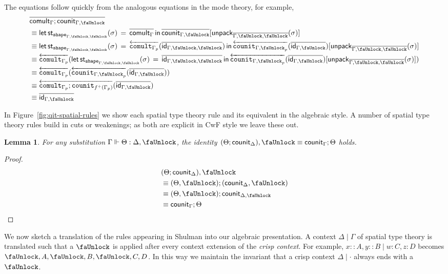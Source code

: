 \documentclass[10pt]{article}
\newtheorem{lemma}{Lemma}
\theoremstyle{definition}
\newcommand{\id}{\mathsf{id}}
\newcommand{\rewrite}[2]{\overleftarrow{#1}(#2)}
\newcommand\StI[2]{\ensuremath{\mathsf{st}_{#1}(#2)}}
\newcommand\StE[4]{\ensuremath{\mathsf{let} \, \StI{#1}{#3} \, = \, {#2} \, \mathsf{in} \, #4}}
\newcommand\TrPlus[2]{\ensuremath{{#1}^+(#2)}}
\newcommand\unpack[2]{\ensuremath{\mathsf{unpack}_{#1}(#2)}}
\newcommand{\modeof}[1]{{#1}_p}
\newcommand{\tshape}[1]{\ensuremath{\mathtt{shape}_{#1}}}
\newcommand{\qyields}{\Vdash}
\newcommand{\upstairs}[1]{\overline{#1}}
\newcommand{\lock}{\text{\faUnlock}}
\newcommand\fcomult[1]{\ensuremath{\mathtt{comult}_{#1}}}
\newcommand\fcounit[1]{\ensuremath{\mathtt{counit}_{#1}}}
\newcommand{\counit}[1]{\mathsf{counit}_{#1}}
\newcommand{\comult}[1]{\mathsf{comult}_{#1}}
\begin{document}
The equations follow quickly from the analogous equations in the mode theory, for example, 
\begin{align*}
&\upstairs{\comult{\Gamma} ; \counit{\Gamma, \lock}} \\
&\equiv \StE{\tshape{\Gamma, \lock, \lock}}{\upstairs{\comult{\Gamma}}}{\sigma}{\upstairs{\counit{\Gamma, \lock}}[\unpack{\upstairs{\Gamma, \lock, \lock}}{\sigma}]} \\
&\equiv \StE{\tshape{\Gamma, \lock, \lock}}{\rewrite{\fcomult{\modeof{\Gamma}}}{\upstairs{\id_{\Gamma, \lock, \lock}}}}{\sigma}{\rewrite{\fcounit{\modeof{\Gamma, \lock}}}{\upstairs{\id_{\Gamma, \lock}}}[\unpack{\upstairs{\Gamma, \lock, \lock}}{\sigma}]} \\
&\equiv \rewrite{\fcomult{\modeof{\Gamma}}}{\StE{\tshape{\Gamma, \lock, \lock}}{\upstairs{\id_{\Gamma, \lock, \lock}}}{\sigma}{\rewrite{\fcounit{\modeof{\Gamma, \lock}}}{\upstairs{\id_{\Gamma, \lock}}}[\unpack{\upstairs{\Gamma, \lock, \lock}}{\sigma}]}} \\
&\equiv \rewrite{\fcomult{\modeof{\Gamma}}}{\rewrite{\fcounit{\modeof{\Gamma, \lock}}}{\upstairs{\id_{\Gamma, \lock}}}} \\
&\equiv \rewrite{\fcomult{\modeof{\Gamma}};\fcounit{\TrPlus{f}{\modeof{\Gamma}}}}{\upstairs{\id_{\Gamma, \lock}}} \\
&\equiv \upstairs{\id_{\Gamma, \lock}}
\end{align*}

In Figure~\ref{fig:qit-spatial-rules} we show each spatial type theory rule and its equivalent in the algebraic style. A number of spatial type theory rules build in cuts or weakenings; as both are explicit in CwF style we leave these out.

\begin{lemma}
For any substitution $\Gamma \qyields \Theta : \Delta, \lock$, the identity $(\Theta ; \counit{\Delta}), \lock \equiv \counit{\Gamma} ; \Theta$ holds.
\end{lemma}
\begin{proof}
\begin{align*}
&(\Theta ; \counit{\Delta}), \lock \\
&\equiv (\Theta, \lock) ; (\counit{\Delta}, \lock) \\
&\equiv (\Theta, \lock) ; \counit{\Delta, \lock}\\
&\equiv \counit{\Gamma} ; \Theta
\end{align*}
\end{proof}

We now sketch a translation of the rules appearing in Shulman  into our algebraic presentation. A context $\Delta \mid \Gamma$ of spatial type theory is translated such that a $\lock$ is applied after every context extension of the \emph{crisp context}. For example, $x :: A, y :: B \mid w : C, z : D$ becomes $\lock, A, \lock, B, \lock, C, D$. In this way we maintain the invariant that a crisp context $\Delta \mid \cdot$ always ends with a $\lock$. 
\end{document}
